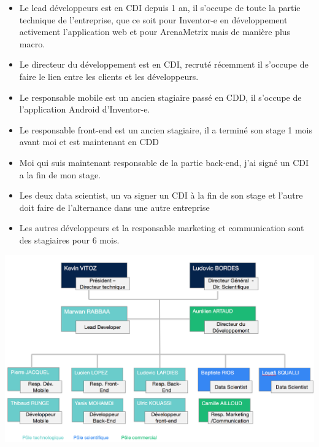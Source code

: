 \begin{itemize}
  \item[\textbullet] Le lead développeurs est en CDI depuis 1 an, il s'occupe de toute la partie technique de l'entreprise, que ce soit pour Inventor-e en développement activement l'application web et pour ArenaMetrix mais de manière plus macro.

  \item[\textbullet] Le directeur du développement est en CDI, recruté récemment il s'occupe de faire le lien entre les clients et les développeurs.

  \item[\textbullet] Le responsable mobile est un ancien stagiaire passé en CDD, il s'occupe de l'application Android d'Inventor-e.
  
  \item[\textbullet] Le responsable front-end est un ancien stagiaire, il a terminé son stage 1 mois avant moi et est maintenant en CDD
  
  \item[\textbullet] Moi qui suis maintenant responsable de la partie back-end, j'ai signé un CDI a la fin de mon stage.
  
  \item[\textbullet] Les deux data scientist, un va signer un CDI à la fin de son stage et l'autre doit faire de l'alternance dans une autre entreprise
  
          
  \item[\textbullet]Les autres développeurs et la responsable marketing et communication sont des stagiaires pour 6 mois. 

\end{itemize}

\begin{center}
\includegraphics[scale=0.57]{images/organigamme.png}
\label{organigramme}
\end{center}



